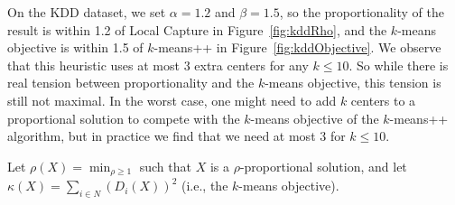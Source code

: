 

On the KDD dataset, we set $\alpha = 1.2$ and $\beta = 1.5$, so the proportionality of the result is within 1.2 of Local Capture in Figure~\ref{fig:kddRho}, and the $k$-means objective is within 1.5 of $k$-means++ in Figure~\ref{fig:kddObjective}.  We observe that this heuristic uses at most $3$ extra centers for any $k \le 10$. So while there is real tension between proportionality and the $k$-means objective, this tension is still not maximal. In the worst case, one might need to add $k$ centers to a proportional solution to compete with the $k$-means objective of the $k$-means++ algorithm, but in practice we find that we need at most $3$ for $k \le 10$. 

\iffalse
Let $\rho(X) = \min_{\rho \geq 1}$ such that $X$ is a $\rho$-proportional solution, and let $\kappa(X) = \sum_{i \in N} \left( D_i(X) \right)^2$ (i.e., the $k$-means objective).

